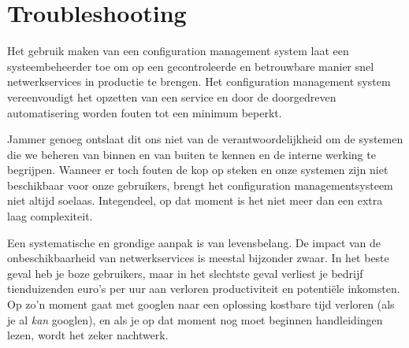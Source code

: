 \section{Troubleshooting}
\label{sec:troubleshooting-1}

Het gebruik maken van een configuration management system laat een systeembeheerder toe om op een gecontroleerde en betrouwbare manier snel netwerkservices in productie te brengen. Het configuration management system vereenvoudigt het opzetten van een service en door de doorgedreven automatisering worden fouten tot een minimum beperkt.

Jammer genoeg ontslaat dit ons niet van de verantwoordelijkheid om de systemen die we beheren van binnen en van buiten te kennen en de interne werking te begrijpen. Wanneer er toch fouten de kop op steken en onze systemen zijn niet beschikbaar voor onze gebruikers, brengt het configuration managementsysteem niet altijd soelaas. Integendeel, op dat moment is het niet meer dan een extra laag complexiteit.

Een systematische en grondige aanpak is van levensbelang. De impact van de onbeschikbaarheid van netwerkservices is meestal bijzonder zwaar. In het beste geval heb je boze gebruikers, maar in het slechtste geval verliest je bedrijf tienduizenden euro's per uur aan verloren productiviteit en potentiële inkomsten. Op zo'n moment gaat met googlen naar een oplossing kostbare tijd verloren (als je al \emph{kan} googlen), en als je op dat moment nog moet beginnen handleidingen lezen, wordt het zeker nachtwerk.

